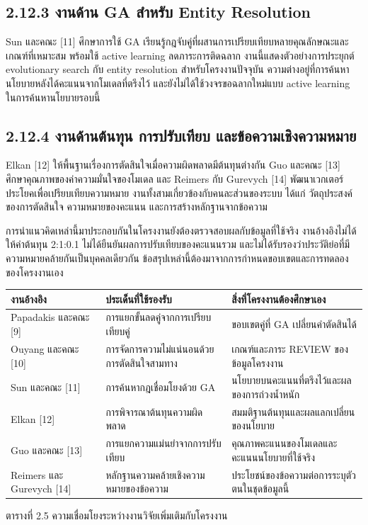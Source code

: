 \documentclass[12pt,a4paper]{report}
\begin{document}
\subsection*{2.12.3 งานด้าน GA สำหรับ Entity Resolution}
Sun และคณะ [11] ศึกษาการใช้ GA เรียนรู้กฎจับคู่ที่ผสานการเปรียบเทียบหลายคุณลักษณะและเกณฑ์ที่เหมาะสม พร้อมใช้ active learning ลดภาระการติดฉลาก งานนี้แสดงตัวอย่างการประยุกต์ evolutionary search กับ entity resolution สำหรับโครงงานปัจจุบัน ความต่างอยู่ที่การค้นหานโยบายหลังได้คะแนนจากโมเดลที่ตรึงไว้ และยังไม่ได้ใช้วงจรขอฉลากใหม่แบบ active learning ในการค้นหานโยบายรอบนี้

\subsection*{2.12.4 งานด้านต้นทุน การปรับเทียบ และข้อความเชิงความหมาย}
Elkan [12] ให้พื้นฐานเรื่องการตัดสินใจเมื่อความผิดพลาดมีต้นทุนต่างกัน Guo และคณะ [13] ศึกษาคุณภาพของค่าความมั่นใจของโมเดล และ Reimers กับ Gurevych [14] พัฒนาเวกเตอร์ประโยคเพื่อเปรียบเทียบความหมาย งานทั้งสามเกี่ยวข้องกับคนละส่วนของระบบ ได้แก่ วัตถุประสงค์ของการตัดสินใจ ความหมายของคะแนน และการสร้างหลักฐานจากข้อความ

การนำแนวคิดเหล่านี้มาประกอบกันในโครงงานยังต้องตรวจสอบผลกับข้อมูลที่ใช้จริง งานอ้างอิงไม่ได้ให้ค่าต้นทุน 2:1:0.1 ไม่ได้ยืนยันผลการปรับเทียบของคะแนนรวม และไม่ได้รับรองว่าประวัติย่อที่มีความหมายคล้ายกันเป็นบุคคลเดียวกัน ข้อสรุปเหล่านี้ต้องมาจากการกำหนดขอบเขตและการทดลองของโครงงานเอง

\begin{center}\small
\begin{tabularx}{\linewidth}{p{2.8cm}XX}
\toprule
งานอ้างอิง & ประเด็นที่ใช้รองรับ & สิ่งที่โครงงานต้องศึกษาเอง \\
\midrule
Papadakis และคณะ [9] & การแยกขั้นลดคู่จากการเปรียบเทียบคู่ & ขอบเขตคู่ที่ GA เปลี่ยนคำตัดสินได้ \\
Ouyang และคณะ [10] & การจัดการความไม่แน่นอนด้วยการตัดสินใจสามทาง & เกณฑ์และภาระ REVIEW ของข้อมูลโครงงาน \\
Sun และคณะ [11] & การค้นหากฎเชื่อมโยงด้วย GA & นโยบายบนคะแนนที่ตรึงไว้และผลของการถ่วงน้ำหนัก \\
Elkan [12] & การพิจารณาต้นทุนความผิดพลาด & สมมติฐานต้นทุนและผลแลกเปลี่ยนของนโยบาย \\
Guo และคณะ [13] & การแยกความแม่นยำจากการปรับเทียบ & คุณภาพคะแนนของโมเดลและคะแนนนโยบายที่ใช้จริง \\
Reimers และ Gurevych [14] & หลักฐานความคล้ายเชิงความหมายของข้อความ & ประโยชน์ของข้อความต่อการระบุตัวตนในชุดข้อมูลนี้ \\
\bottomrule
\end{tabularx}
\par ตารางที่ 2.5 ความเชื่อมโยงระหว่างงานวิจัยเพิ่มเติมกับโครงงาน
\end{center}
\end{document}
